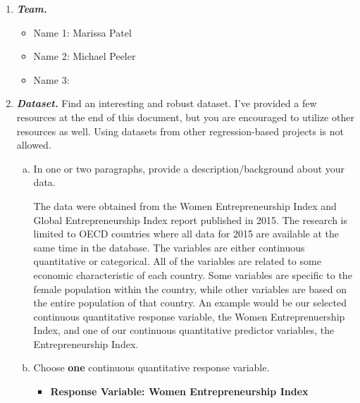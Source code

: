 \documentclass{article}\usepackage[]{graphicx}\usepackage[]{xcolor}
\begin{document}
\vspace{.2cm}
\begin{enumerate}[1.]
	\item \textbf{\textit{Team.}} 
	\begin{itemize}
		\vspace{.2cm}
		\item Name 1: Marissa Patel
		
		\vspace{.2cm}
		\item Name 2: Michael Peeler
		
		\vspace{.2cm}
		\item Name 3:
	\end{itemize}
		\vspace{.2cm}
		

\item \textbf{\textit{Dataset.}} Find an interesting and robust dataset. I've provided a few resources at the end of this document, but you are encouraged to utilize other resources as well. Using datasets from other regression-based projects is not allowed. 
	\vspace{.2cm}

\begin{enumerate}[(a)]
	\item In one or two paragraphs, provide a description/background about your data.
	
The data were obtained from the Women Entrepreneurship Index and Global Entrepreneurship Index report published in 2015. The research is limited to OECD countries where all data for 2015 are available at the same time in the database. The variables are either continuous quantitative or categorical. All of the variables are related to some economic characteristic of each country. Some variables are specific to the female population within the country, while other variables are based on the entire population of that country. An example would be our selected continuous quantitative response variable, the Women Entreprenuership Index, and one of our continuous quantitative predictor variables, the Entrepreneurship Index. 

	
	\item Choose \textbf{one} continuous quantitative response variable. 
	
	\vspace{.2cm}
	\begin{itemize}
		\item \textbf{Response Variable: Women Entrepreneurship Index}
	\end{itemize}
	\vspace{.2cm}
		

\end{enumerate}
\end{enumerate}
\end{document}

